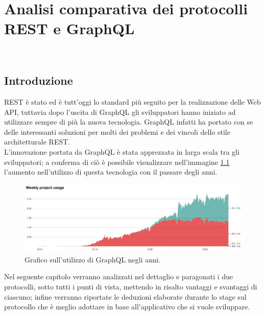 
\chapter{Analisi comparativa dei protocolli REST e GraphQL}
\label{analisi-comparativa}
\\
\section{Introduzione}
REST è stato ed è tutt'oggi lo standard più seguito per la realizzazione delle Web API, tuttavia dopo l'uscita di GraphQL gli sviluppatori hanno iniziato ad utilizzare sempre di più la nuova tecnologia. GraphQL infatti ha portato con se delle interessanti soluzioni per molti dei problemi e dei vincoli dello stile architetturale REST.\\
L'innovazione portata da GraphQL è stata apprezzata in larga scala tra gli sviluppatori; a conferma di ciò è possibile visualizzare nell'immagine \ref{graphQL-usage-chart} l'aumento nell'utilizzo di questa tecnologia con il passare degli anni.
\FloatBarrier
\begin{figure}[!ht]
\centering
\includegraphics[width=1\linewidth]{immagini/GraphQLUsageChart.png}
\caption{Grafico sull'utilizzo di GraphQL negli anni.}
\label{graphQL-usage-chart}
\end{figure}
\FloatBarrier
Nel seguente capitolo verranno analizzati nel dettaglio e paragonati i due protocolli, sotto tutti i punti di vista, mettendo in risalto vantaggi e svantaggi di ciascuno; infine verranno riportate le deduzioni elaborate durante lo stage sul protocollo che è meglio adottare in base all'applicativo che si vuole sviluppare.

